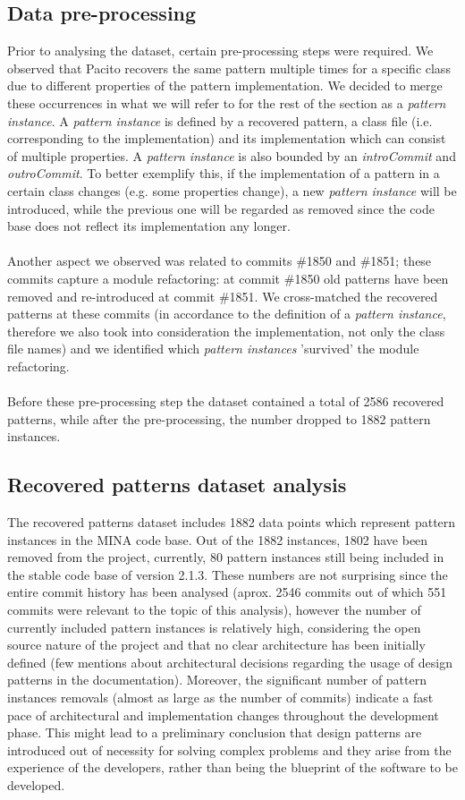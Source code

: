 \subsection{Data pre-processing}
Prior to analysing the dataset, certain pre-processing steps were required. We observed that Pacito recovers the same pattern multiple times for a specific class due to different properties of the pattern implementation. We decided to merge these occurrences in what we will refer to for the rest of the section as a \textit{pattern instance}. A \textit{pattern instance} is defined by a recovered pattern, a class file (i.e. corresponding to the implementation) and its implementation which can consist of multiple properties. A \textit{pattern instance} is also bounded by an \textit{introCommit} and \textit{outroCommit}. To better exemplify this, if the implementation of a pattern in a certain class changes (e.g. some properties change), a new \textit{pattern instance} will be introduced, while the previous one will be regarded as removed since the code base does not reflect its implementation any longer.\\\\
Another aspect we observed was related to commits \#1850 and \#1851; these commits capture a module refactoring: at commit \#1850 old patterns have been removed and re-introduced at commit \#1851. We cross-matched the recovered patterns at these commits (in accordance to the definition of a \textit{pattern instance}, therefore we also took into consideration the implementation, not only the class file names) and we identified which \textit{pattern instances} 'survived' the module refactoring.\\\\
Before these pre-processing step the dataset contained a total of 2586 recovered patterns, while after the pre-processing, the number dropped to 1882 pattern instances.


\subsection{Recovered patterns dataset analysis}
The recovered patterns dataset includes 1882 data points which represent pattern instances in the MINA code base. Out of the 1882 instances, 1802 have been removed from the project, currently, 80 pattern instances still being included in the stable code base of version 2.1.3. These numbers are not surprising since the entire commit history has been analysed (aprox. 2546 commits out of which 551 commits were relevant to the topic of this analysis), however the number of currently included pattern instances is relatively high, considering the open source nature of the project and that no clear architecture has been initially defined (few mentions about architectural decisions regarding the usage of design patterns in the documentation). Moreover, the significant number of pattern instances removals (almost as large as the number of commits) indicate a fast pace of architectural and implementation changes throughout the development phase. This might lead to a preliminary conclusion that design patterns are introduced out of necessity for solving complex problems and they arise from the experience of the developers, rather than being the blueprint of the software to be developed.
